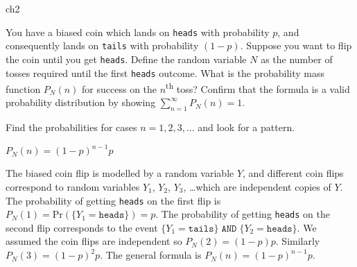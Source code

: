 \begin{problems}{ch2}

	\begin{problem}		\label{problem:geometric_distr_biased_coin_until_heads}
		You have a biased coin which lands on \texttt{heads} with probability $p$,
		and consequently lands on \texttt{tails} with probability $(1-p)$.
		Suppose you want to flip the coin until you get \texttt{heads}.
		Define the random variable $N$ as the number of tosses required until the first \texttt{heads} outcome.
		What is the probability mass function $P_N(n)$ for success on the $n$\textsuperscript{th} toss?
		Confirm that the formula is a valid probability distribution by showing $\sum_{n=1}^\infty P_N(n) = 1$.

		\begin{hint}
			Find the probabilities for cases $n=1,2,3,\ldots$ and look for a pattern.
		\end{hint}

		\begin{answer}$P_N(n) = (1-p)^{n-1}p$\end{answer}

		\begin{solution}
			The biased coin flip is modelled by a random variable $Y$,
			and different coin flips correspond to random variables $Y_1$, $Y_2$, $Y_3$, \ldots which are independent copies of $Y$.
			The probability of getting \texttt{heads} on the first flip is $P_N(1)=\textrm{Pr}\!\left( \{ Y_1=\texttt{heads} \} \right)\! =p$.
			The probability of getting \texttt{heads} on the second flip corresponds
			to the event $\{Y_1=\texttt{tails}\} \; \texttt{AND} \; \{Y_2=\texttt{heads} \}$.
			We assumed the coin flips are independent so 			$P_N(2)=(1-p)p$.
			Similarly $P_N(3) = (1-p)^2p$.
			The general formula is $P_N(n) = (1-p)^{n-1}p$.
		\end{solution}
	\end{problem}


\end{problems}